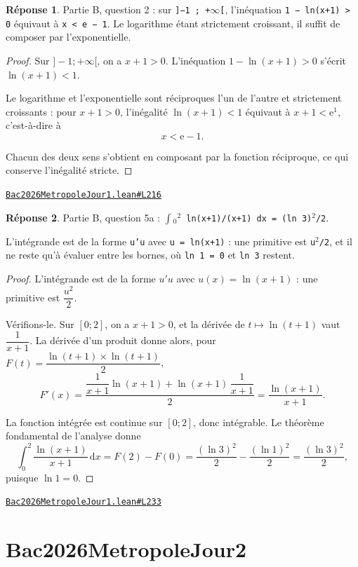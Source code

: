 \documentclass[11pt,a4paper]{article}
\theoremstyle{definition}
\theoremstyle{plain}
\theoremstyle{definition}
\newtheorem*{reponse}{Réponse}
\newcommand{\source}[2]{\par\smallskip\noindent\hfill{\footnotesize\href{#1}{\texttt{#2}}}\par\smallskip}
\begin{document}
\begin{reponse}
Partie B, question 2 : sur \texttt{]−1 ; +\(\infty\)[}, l'inéquation \texttt{1 − ln(x+1) > 0} équivaut à
\texttt{x < e − 1}. Le logarithme étant strictement croissant, il suffit de composer par
l'exponentielle.
\end{reponse}
\begin{proof}
Sur $]-1 ; +\infty[$, on a $x + 1 > 0$. L'inéquation $1 - \ln(x+1) > 0$ s'écrit
$\ln(x+1) < 1$.

Le logarithme et l'exponentielle sont réciproques l'un de l'autre et strictement
croissants : pour $x + 1 > 0$, l'inégalité $\ln(x+1) < 1$ équivaut à
$x + 1 < \mathrm{e}^1$, c'est-à-dire à
\[ x < \mathrm{e} - 1 . \]

Chacun des deux sens s'obtient en composant par la fonction réciproque, ce qui conserve
l'inégalité stricte.
\end{proof}
\source{https://github.com/Commutator-IO/learn-lean/blob/main/exams/2026/Bac2026MetropoleJour1.lean\#L216}{Bac2026MetropoleJour1.lean\#L216}

\begin{reponse}
Partie B, question 5a : \texttt{\(\int\)\(_{0}\)\(^{2}\) ln(x+1)/(x+1) dx = (ln 3)\(^{2}\)/2}.

L'intégrande est de la forme \texttt{u'u} avec \texttt{u = ln(x+1)} : une primitive est \texttt{u\(^{2}\)/2}, et
il ne reste qu'à évaluer entre les bornes, où \texttt{ln 1 = 0} et \texttt{ln 3} restent.
\end{reponse}
\begin{proof}
L'intégrande est de la forme $u'u$ avec $u(x) = \ln(x+1)$ : une primitive est
$\dfrac{u^2}{2}$.

Vérifions-le. Sur $[0 ; 2]$, on a $x + 1 > 0$, et la dérivée de $t \mapsto \ln(t+1)$ vaut
$\dfrac{1}{x+1}$. La dérivée d'un produit donne alors, pour
$F(t) = \dfrac{\ln(t+1) \times \ln(t+1)}{2}$,
\[ F'(x) = \frac{\dfrac{1}{x+1}\ln(x+1) + \ln(x+1)\,\dfrac{1}{x+1}}{2}
   = \frac{\ln(x+1)}{x+1} . \]

La fonction intégrée est continue sur $[0 ; 2]$, donc intégrable. Le théorème fondamental
de l'analyse donne
\[ \int_0^2 \frac{\ln(x+1)}{x+1}\,\mathrm{d}x = F(2) - F(0)
   = \frac{(\ln 3)^2}{2} - \frac{(\ln 1)^2}{2} = \frac{(\ln 3)^2}{2} , \]
puisque $\ln 1 = 0$.
\end{proof}
\source{https://github.com/Commutator-IO/learn-lean/blob/main/exams/2026/Bac2026MetropoleJour1.lean\#L233}{Bac2026MetropoleJour1.lean\#L233}

\section{Bac2026MetropoleJour2}
\end{document}
